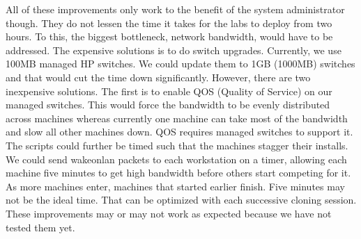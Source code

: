 All of these improvements only work to the benefit of the system administrator though.  They do not lessen the time it takes for the labs to deploy from two hours.  To this, the biggest bottleneck, network bandwidth, would have to be addressed.  The expensive solutions is to do switch upgrades.  Currently, we use 100MB managed HP switches.  We could update them to 1GB (1000MB) switches and that would cut the time down significantly.  However, there are two inexpensive solutions.  The first is to enable QOS (Quality of Service) on our managed switches.  This would force the bandwidth to be evenly distributed across machines whereas currently one machine can take most of the bandwidth and slow all other machines down.  QOS requires managed switches to support it.   The scripts could further be timed such that the machines stagger their installs.  We could send wakeonlan packets to each workstation on a timer, allowing each machine five minutes to get high bandwidth before others start competing for it.  As more machines enter, machines that started earlier finish.  Five minutes may not be the ideal time.  That can be optimized with each successive cloning session.  These improvements may or may not work as expected because we have not tested them yet.   

